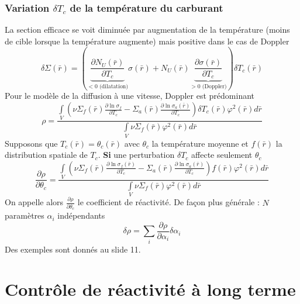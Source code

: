 		\subsubsection{Variation $\delta T_c$ de la température du carburant}
		La section efficace se voit diminuée par augmentation de la température (moins de cible 
		lorsque la température augmente) mais positive dans le cas de Doppler
		\begin{equation}
		\delta \Sigma (\bar r) = \left(\underbrace{\frac{{\partial {N_U}(\bar r)}}{{\partial {T_c}}}}
		_{<0\text{ (dilatation)}}\sigma (\bar r) + {N_U}(\bar r)\underbrace{\frac{{\partial \sigma
		 (\bar r)}}	{{\partial {T_c}}}}_{>0\text{ (Doppler)}}	\right)\delta {T_c}(\bar r)
		\end{equation}
		Pour le modèle de la diffusion à une vitesse, Doppler est prédominant
		\begin{equation}
		\rho  = \frac{{\int\limits_V    (\nu {\Sigma _f}(\bar r)\frac{{\partial \ln {\sigma _f}}}
		{{\partial {T_c}}} - {\Sigma _a}(\bar r)\frac{{\partial \ln {\sigma _a}(\bar r)}}{{\partial
		 {T_c}}})\delta {T_c}(\bar r){\varphi ^2}(\bar r)d\bar r}}{{\int\limits_V  \nu {\Sigma _f}
		 (\bar r){\varphi ^2}(\bar r)d\bar r}}
		\end{equation}
		Supposons que $T_c(\bar r) = \theta_c(\bar r)$ avec $\theta_c$ la température moyenne et
		$f(\bar r)$ la distribution spatiale de $T_c$. \textbf{Si} une perturbation 
		$\delta T_c$ affecte seulement $\theta_c$ 
		\begin{equation}
		\frac{{\partial \rho }}{{\partial {\theta _c}}} = \frac{{\int\limits_V    (\nu {\Sigma _f}
		(\bar r)\frac{{\partial \ln {\sigma _f}(\bar r)}}{{\partial {T_c}}} - {\Sigma _a}(\bar r)
		\frac{{\partial \ln {\sigma _a}(\bar r)}}{{\partial {T_c}}})f(\bar r){\varphi ^2}(\bar r)d\bar
		 r}}{{\int\limits_V   \nu {\Sigma _f}(\bar r){\varphi ^2}(\bar r)d\bar r}}
		\end{equation}
		On appelle alors $\frac{{\partial \rho }}{{\partial {\theta _c}}}$ le coefficient de 
		réactivité. De façon plus générale : $N$ paramètres $\alpha_i$ indépendants
		\begin{equation}
		\delta \rho  = \sum\limits_i    \frac{{\partial \rho }}{{\partial {\alpha _i}}}\delta {\alpha
		 _i}
		\end{equation}
		Des exemples sont donnés au slide 11.
		
\section{Contrôle de réactivité à long terme}		

